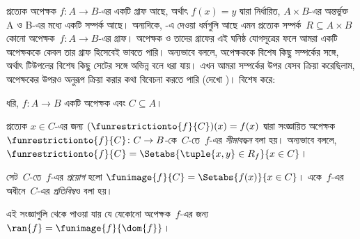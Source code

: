 \documentclass[../../../include/open-logic-section]{subfiles}
\begin{document}
\begin{explain}
প্রত্যেক অপেক্ষক $f\colon A \to B$-এর একটি গ্রাফ আছে, অর্থাৎ $f(x) = y$ দ্বারা নির্ধারিত, $A \times B$-এর অন্তর্ভুক্ত A ও B-এর মধ্যে একটি সম্পর্ক আছে। অন্যদিকে, -এ দেওয়া ধর্মগুলি আছে এমন প্রত্যেক সম্পর্ক~$R
\subseteq A \times B$ কোনো অপেক্ষক~$f \colon A \to
B$-এর গ্রাফ। অপেক্ষক ও তাদের গ্রাফের এই ঘনিষ্ঠ যোগসূত্রের ফলে আমরা একটি অপেক্ষককে কেবল তার গ্রাফ হিসেবেই ভাবতে পারি। অন্যভাবে বললে, অপেক্ষককে বিশেষ কিছু সম্পর্কের সঙ্গে, অর্থাৎ টিউপলের বিশেষ কিছু সেটের সঙ্গে অভিন্ন বলে ধরা যায়। এখন আমরা সম্পর্কের উপর যেসব ক্রিয়া করেছিলাম, অপেক্ষকের উপরও অনুরূপ ক্রিয়া করার কথা বিবেচনা করতে পারি (দেখো )। বিশেষ করে: 
\end{explain}

\begin{defn}
ধরি, $f \colon A \to B$ একটি অপেক্ষক এবং $C\subseteq A$।

প্রত্যেক $x \in C$-এর জন্য $(\funrestrictionto{f}{C})(x) = f(x)$ দ্বারা সংজ্ঞায়িত অপেক্ষক~$\funrestrictionto{f}{C}\colon C \to B$-কে~$C$-তে~$f$-এর \emph{সীমাবদ্ধন} বলা হয়। অন্যভাবে বললে, $\funrestrictionto{f}{C} = \Setabs{\tuple{x, y} \in R_f}{x \in
C}$।

সেট~$C$-তে~$f$-এর \emph{প্রয়োগ} হলো $\funimage{f}{C} =
\Setabs{f(x)}{x \in C}$। একে~$f$-এর অধীনে~$C$-এর \emph{প্রতিবিম্ব}ও বলা হয়।
\end{defn}

\begin{explain}
এই সংজ্ঞাগুলি থেকে পাওয়া যায় যে যেকোনো অপেক্ষক~$f$-এর জন্য $\ran{f} =
\funimage{f}{\dom{f}}$।
\end{explain}
\end{document}
